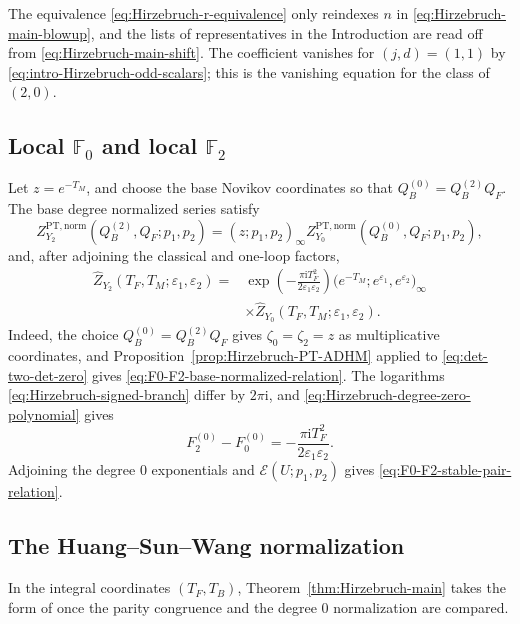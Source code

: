 \documentclass{amsart}
\theoremstyle{definition}
\numberwithin{equation}{section}
\newcommand{\eps}{\varepsilon}
\newcommand{\PT}{\mathrm{PT}}
\begin{document}
The equivalence \eqref{eq:Hirzebruch-r-equivalence} only reindexes \(n\) in \eqref{eq:Hirzebruch-main-blowup}, and the lists of representatives in the Introduction are read off from \eqref{eq:Hirzebruch-main-shift}.  The coefficient vanishes for \((j,d)=(1,1)\) by \eqref{eq:intro-Hirzebruch-odd-scalars}; this is the vanishing equation for the class of \((2,0)\).

\subsection{Local \texorpdfstring{\(\mathbb F_0\)}{F0} and local \texorpdfstring{\(\mathbb F_2\)}{F2}}
Let \(z=e^{-T_M}\), and choose the base Novikov coordinates so that \(Q_B^{(0)}=Q_B^{(2)}Q_F\).  The base degree normalized series satisfy
\begin{equation}
 Z_{Y_2}^{\PT,\mathrm{norm}}(Q_B^{(2)},Q_F;p_1,p_2)
 =(z;p_1,p_2)_\infty
  Z_{Y_0}^{\PT,\mathrm{norm}}(Q_B^{(0)},Q_F;p_1,p_2),
\label{eq:F0-F2-base-normalized-relation}
\end{equation}
and, after adjoining the classical and one-loop factors,
\begin{equation}
\begin{aligned}
 \widehat Z_{Y_2}(T_F,T_M;\eps_1,\eps_2)
 ={}&\exp\left(-\frac{\pi\mathrm{i}T_F^2}{2\eps_1\eps_2}\right)
 \bigl(e^{-T_M};e^{\eps_1},e^{\eps_2}\bigr)_\infty\\
 &\times\widehat Z_{Y_0}(T_F,T_M;\eps_1,\eps_2).
\end{aligned}
\label{eq:F0-F2-stable-pair-relation}
\end{equation}
Indeed, the choice \(Q_B^{(0)}=Q_B^{(2)}Q_F\) gives \(\zeta_0=\zeta_2=z\) as multiplicative coordinates, and Proposition~\ref{prop:Hirzebruch-PT-ADHM} applied to \eqref{eq:det-two-det-zero} gives \eqref{eq:F0-F2-base-normalized-relation}.  The logarithms \eqref{eq:Hirzebruch-signed-branch} differ by \(2\pi\mathrm{i}\), and \eqref{eq:Hirzebruch-degree-zero-polynomial} gives
\[
 F_2^{(0)}-F_0^{(0)}
 =-\frac{\pi\mathrm{i}T_F^2}{2\eps_1\eps_2}.
\]
Adjoining the degree \(0\) exponentials and \(\mathcal E(U;p_1,p_2)\) gives \eqref{eq:F0-F2-stable-pair-relation}.

\subsection{The Huang--Sun--Wang normalization}
In the integral coordinates \((T_F,T_B)\), Theorem~\ref{thm:Hirzebruch-main} takes the form of \cite{HuangSunWang} once the parity congruence and the degree \(0\) normalization are compared.
\end{document}
